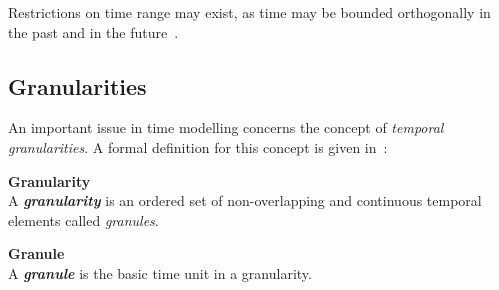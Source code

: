 Restrictions on time range may exist, as time may be bounded orthogonally in the past and in the future~\cite{Jensen94thetsql2}.



\subsection{Granularities}\label{subsec:granularity}
An important issue in time modelling concerns the concept of \emph{temporal granularities}. A formal definition for this concept is given in~\cite{Lin97}:

\begin{svgraybox}
\vspace{-10pt}
\begin{definition}\textbf{Granularity}~\cite{wang93}\\
A \emph{\textbf{granularity}} is an ordered set of non-overlapping and continuous temporal elements called \emph{granules}.
\end{definition}

\begin{definition}\textbf{Granule}\\
A \textbf{\emph{granule}} is the basic time unit in a granularity.
\end{definition}
\vspace{-10pt}
\end{svgraybox}


